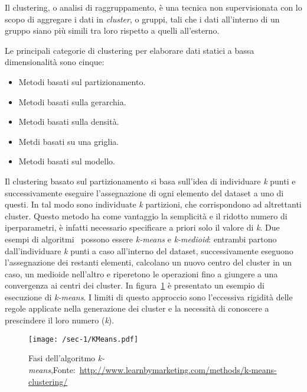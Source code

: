 Il clustering, o analisi di raggruppamento, è una tecnica non supervisionata con lo scopo di aggregare i dati in \textit{cluster}, o gruppi,
tali che i dati all'interno di un gruppo siano più simili tra loro rispetto a quelli all'esterno\cite{liao2005clustering, zazzarro2009clustering}.

Le principali categorie di clustering per elaborare dati statici a bassa dimensionalità sono cinque:

\begin{itemize}
  \item Metodi basati sul partizionamento.
  \item Metodi basati sulla gerarchia.
  \item Metodi basati sulla densità.
  \item Metdi basati su una griglia.
  \item Metodi basati sul modello.
\end{itemize}

Il clustering basato sul partizionamento si basa sull'idea di individuare \textit{k} punti e successivamente
eseguire l'assegnazione di ogni elemento del dataset a uno di questi.
In tal modo sono individuate \textit{k} partizioni, che corrispondono ad altrettanti cluster.
Questo metodo ha come vantaggio la semplicità e il ridotto numero di iperparametri,
è infatti necessario specificare a priori solo il valore di \textit{k}.
Due esempi di algoritmi~\cite{arora2016analysis} possono essere \textit{k-means} e \textit{k-medioid}:
entrambi partono dall'individuare \textit{k} punti a caso all'interno del dataset, successivamente eseguono l'assegnazione dei restanti elementi,
calcolano un nuovo centro del cluster in un caso, un medioide nell'altro e riperetono le operazioni fino a giungere a una convergenza ai centri dei cluster.
In figura~\cref{fig:chap-1:k-means-overview} è presentato un esempio di esecuzione di \textit{k-means}.
I limiti di questo approccio sono l'eccessiva rigidità delle regole applicate nella generazione dei cluster e la necessità di conoscere a prescindere il loro numero (\textit{k}).

\begin{figure}
  \centering
  \texttt{[image: /sec-1/KMeans.pdf]}
  \caption{Fasi dell'algoritmo \textit{k-means},Fonte:~\url{http://www.learnbymarketing.com/methods/k-means-clustering/}}%
  \label{fig:chap-1:k-means-overview}
\end{figure}

